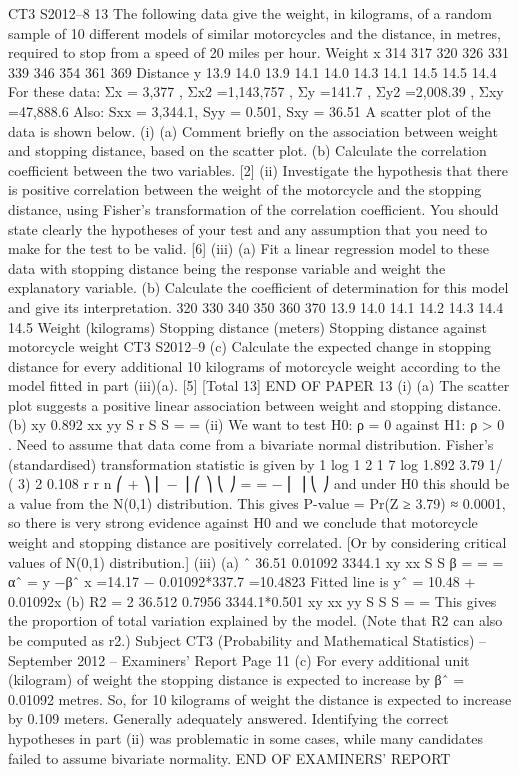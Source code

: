 CT3 S2012–8
13 The following data give the weight, in kilograms, of a random sample of 10 different
models of similar motorcycles and the distance, in metres, required to stop from a
speed of 20 miles per hour.
Weight x 314 317 320 326 331 339 346 354 361 369
Distance y 13.9 14.0 13.9 14.1 14.0 14.3 14.1 14.5 14.5 14.4
For these data: Σx = 3,377 , Σx2 =1,143,757 , Σy =141.7 ,
Σy2 =2,008.39 , Σxy =47,888.6
Also: Sxx = 3,344.1, Syy = 0.501, Sxy = 36.51
A scatter plot of the data is shown below.
(i) (a) Comment briefly on the association between weight and stopping
distance, based on the scatter plot.
(b) Calculate the correlation coefficient between the two variables.
[2]
(ii) Investigate the hypothesis that there is positive correlation between the weight
of the motorcycle and the stopping distance, using Fisher’s transformation of
the correlation coefficient. You should state clearly the hypotheses of your
test and any assumption that you need to make for the test to be valid. [6]
(iii) (a) Fit a linear regression model to these data with stopping distance being
the response variable and weight the explanatory variable.
(b) Calculate the coefficient of determination for this model and give its
interpretation.
320 330 340 350 360 370
13.9 14.0 14.1 14.2 14.3 14.4 14.5
Weight (kilograms)
Stopping distance (meters)
Stopping distance against motorcycle weight
CT3 S2012–9
(c) Calculate the expected change in stopping distance for every additional
10 kilograms of motorcycle weight according to the model fitted in
part (iii)(a).
[5]
[Total 13]
END OF PAPER
13 (i) (a) The scatter plot suggests a positive linear association between weight
and stopping distance.
(b) xy 0.892
xx yy
S
r
S S
= =
  (ii) We want to test H0: ρ = 0 against H1: ρ > 0 .
Need to assume that data come from a bivariate normal distribution.
Fisher’s (standardised) transformation statistic is given by
1 log 1
2 1 7 log 1.892 3.79
1/ ( 3) 2 0.108
r
r
n
⎛ + ⎞
⎜ − ⎟ ⎛ ⎞ ⎝ ⎠ = = − ⎜ ⎟ ⎝ ⎠
and under H0 this should be a value from the N(0,1) distribution.
This gives P-value = Pr(Z ≥ 3.79) ≈ 0.0001, so there is very strong evidence
against H0 and we conclude that motorcycle weight and stopping distance are
positively correlated.
[Or by considering critical values of N(0,1) distribution.]
(iii) (a) ˆ 36.51 0.01092
3344.1
xy
xx
S
S
β = = =
  αˆ = y −βˆ x =14.17 − 0.01092*337.7 =10.4823
Fitted line is yˆ = 10.48 + 0.01092x
(b) R2 =
  2 36.512 0.7956
3344.1*0.501
xy
xx yy
S
S S
= =
  This gives the proportion of total variation explained by the model.
(Note that R2 can also be computed as r2.)
Subject CT3 (Probability and Mathematical Statistics) – September 2012 – Examiners’ Report
Page 11
(c) For every additional unit (kilogram) of weight the stopping distance is
expected to increase by βˆ = 0.01092 metres. So, for 10 kilograms of
weight the distance is expected to increase by 0.109 meters.
Generally adequately answered. Identifying the correct hypotheses in part (ii) was
problematic in some cases, while many candidates failed to assume bivariate normality.
END OF EXAMINERS’ REPORT
